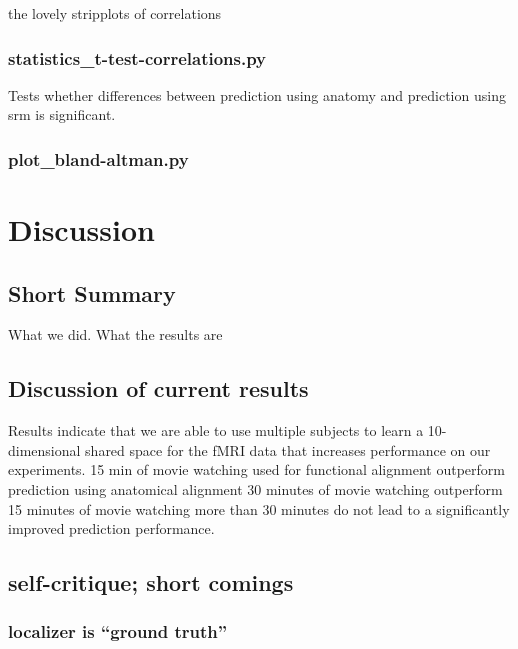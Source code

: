 the lovely stripplots of correlations

\subsubsection{statistics\_t-test-correlations.py}

Tests whether differences between prediction using anatomy and prediction using
\ac{srm} is significant.

\subsubsection{plot\_bland-altman.py}




\section{Discussion}


\subsection{Short Summary}

What we did. What the results are

\subsection{Discussion of current results}

Results indicate that we are able to use multiple subjects to learn a
10-dimensional shared space for the fMRI data that increases performance on our
experiments.
%
15 min of movie watching used for functional alignment outperform prediction
using anatomical alignment
%
30 minutes of movie watching outperform 15 minutes of movie watching
%
more than 30 minutes do not lead to a significantly improved prediction
performance.
%

\subsection{self-critique; short comings}


\subsubsection{localizer is ``ground truth''}

